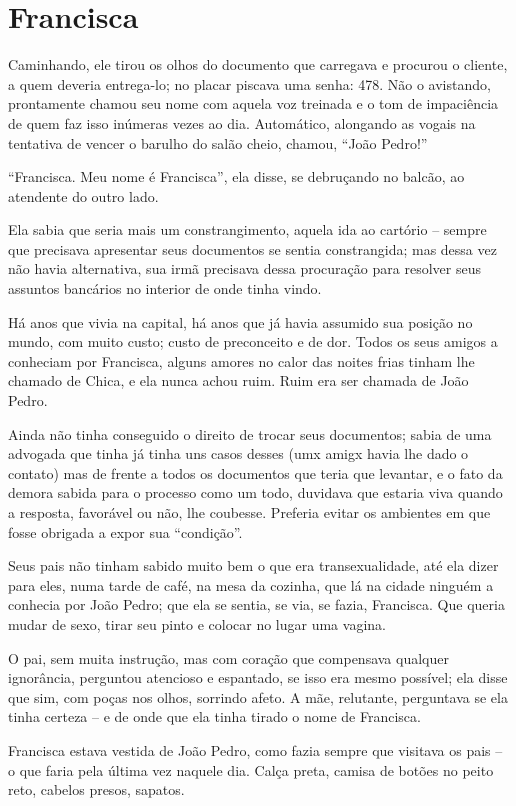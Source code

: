 \documentclass[11pt,a4paper,twoside,openany]{book}
\begin{document}
\chapter*{Francisca}
Caminhando, ele tirou os olhos do documento que carregava e procurou o cliente, a quem deveria entrega-lo; no placar piscava uma senha: 478. Não o avistando, prontamente chamou seu nome com aquela voz treinada e o tom de impaciência de quem faz isso inúmeras vezes ao dia. Automático, alongando as vogais na tentativa de vencer o barulho do salão cheio, chamou, “João Pedro!”

“Francisca. Meu nome é Francisca”, ela disse, se debruçando no balcão, ao atendente do outro lado. 

Ela sabia que seria mais um constrangimento, aquela ida ao cartório – sempre que precisava apresentar seus documentos se sentia constrangida; mas dessa vez não havia alternativa, sua irmã precisava dessa procuração para resolver seus assuntos bancários no interior de onde tinha vindo. 

Há anos que vivia na capital, há anos que já havia assumido sua posição no mundo, com muito custo; custo de preconceito e de dor. Todos os seus amigos a conheciam por Francisca, alguns amores no calor das noites frias tinham lhe chamado de Chica, e ela nunca achou ruim. Ruim era ser chamada de João Pedro.

Ainda não tinha conseguido o direito de trocar seus documentos; sabia de uma advogada que tinha já tinha uns casos desses (umx amigx havia lhe dado o contato) mas de frente a todos os documentos que teria que levantar, e o fato da demora sabida para o processo como um todo, duvidava que estaria viva quando a resposta, favorável ou não, lhe coubesse. Preferia evitar os ambientes em que fosse obrigada a expor sua “condição”. 

Seus pais não tinham sabido muito bem o que era transexualidade, até ela dizer para eles, numa tarde de café, na mesa da cozinha, que lá na cidade ninguém a conhecia por João Pedro; que ela se sentia, se via, se fazia, Francisca. Que queria mudar de sexo, tirar seu pinto e colocar no lugar uma vagina. 

O pai, sem muita instrução, mas com coração que compensava qualquer ignorância, perguntou atencioso e espantado, se isso era mesmo possível; ela disse que sim, com poças nos olhos, sorrindo afeto. A mãe, relutante, perguntava se ela tinha certeza – e de onde que ela tinha tirado o nome de Francisca. 

Francisca estava vestida de João Pedro, como fazia sempre que visitava os pais – o que faria pela última vez naquele dia. Calça preta, camisa de botões no peito reto, cabelos presos, sapatos.
\end{document}
